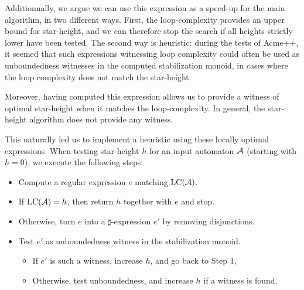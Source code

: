 Additionnally, we argue we can use this expression as a speed-up for the main algorithm, in two different ways.
First, the loop-complexity provides an upper bound for star-height, and we can therefore stop the search if all heights strictly lower have been tested.
The second way is heuristic: during the tests of Acme++, it seemed that such expressions witnessing loop complexity could often be used as unboundedness witnesses in the computed stabilization monoid, in cases where the loop complexity does not match the star-height.

Moreover, having computed this expression allows us to provide a witness of optimal star-height when it matches the loop-complexity. In general, the star-height algorithm does not provide any witness.

This naturally led us to implement a heuristic using these locally optimal expressions.
When testing star-height $h$ for an input automaton $\mathcal{A}$ (starting with $h=0$), we execute the following steps:

\begin{itemize}
\item Compute a regular expression $e$ matching $\mathrm{LC}(\mathcal{A})$.
\item If $\mathrm{LC}(\mathcal{A})=h$, then return $h$ together with $e$ and stop.
\item Otherwise, turn $e$ into a $\sharp$-expression $e'$ by removing disjunctions.
\item Test $e'$ as unboundedness witness in the stabilization monoid.
	\begin{itemize} 
	\item If $e'$ is such a witness, increase $h$, and go back to Step 1,
	\item Otherwise, test unboundedness, and increase $h$ if a witness is found. 
	\end{itemize}
\end{itemize}



